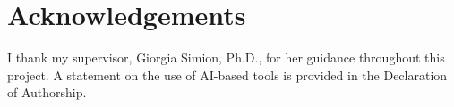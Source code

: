 \chapter*{Acknowledgements}

\noindent I thank my supervisor, Giorgia Simion, Ph.D., for her guidance
throughout this project. A statement on the use of AI-based tools is provided in
the Declaration of Authorship.
